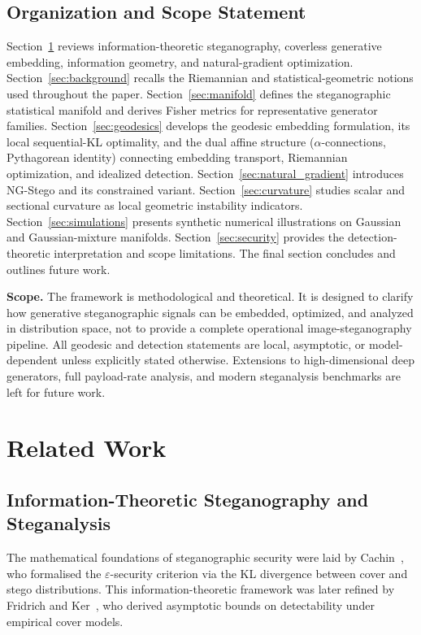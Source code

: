 \documentclass[a4paper,fleqn]{cas-dc}
\begin{document}
\subsection{Organization and Scope Statement}

Section~\ref{sec:related} reviews information-theoretic steganography,
coverless generative embedding, information geometry, and natural-gradient
optimization.
Section~\ref{sec:background} recalls the Riemannian and statistical-geometric
notions used throughout the paper.
Section~\ref{sec:manifold} defines the steganographic statistical manifold and
derives Fisher metrics for representative generator families.
Section~\ref{sec:geodesics} develops the geodesic embedding formulation,
its local sequential-KL optimality, and the dual affine structure
($\alpha$-connections, Pythagorean identity) connecting embedding transport,
Riemannian optimization, and idealized detection.
Section~\ref{sec:natural_gradient} introduces NG-Stego and its constrained variant.
Section~\ref{sec:curvature} studies scalar and sectional curvature as local
geometric instability indicators.
Section~\ref{sec:simulations} presents synthetic numerical illustrations on
Gaussian and Gaussian-mixture manifolds.
Section~\ref{sec:security} provides the detection-theoretic interpretation and
scope limitations.
The final section concludes and outlines future work.

\noindent\textbf{Scope.}
The framework is methodological and theoretical.
It is designed to clarify how generative steganographic signals can be
embedded, optimized, and analyzed in distribution space, not to provide a
complete operational image-steganography pipeline.
All geodesic and detection statements are local, asymptotic, or model-dependent
unless explicitly stated otherwise.
Extensions to high-dimensional deep generators, full payload-rate analysis,
and modern steganalysis benchmarks are left for future work.

\section{Related Work}
\label{sec:related}

\subsection{Information-Theoretic Steganography and Steganalysis}

The mathematical foundations of steganographic security were laid by
Cachin~\cite{cachin1998information}, who formalised the $\varepsilon$-security
criterion via the KL divergence between cover and stego distributions.
This information-theoretic framework was later refined by Fridrich and
Ker~\cite{fridrich2009steganography}, who derived asymptotic bounds on
detectability under empirical cover models.
\end{document}
